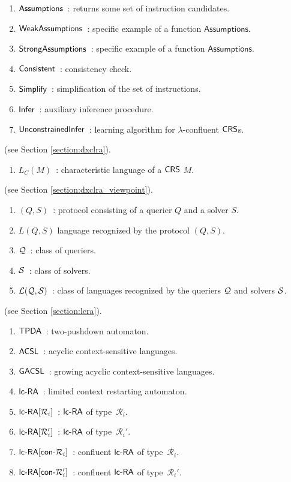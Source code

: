 \begin{enumerate}[]
\item $\textup{\sf Assumptions}$\ : returns some set of instruction candidates.
\item $\textup{\sf WeakAssumptions}$\ : specific example of a function $\mathsf{Assumptions}$.
\item $\textup{\sf StrongAssumptions}$\ : specific example of a function $\mathsf{Assumptions}$.
\item $\textup{\sf Consistent}$\ : consistency check.
\item $\textup{\sf Simplify}$\ : simplification of the set of instructions.
\item $\textup{\sf Infer}$\ : auxiliary inference procedure.
\item $\textup{\sf UnconstrainedInfer}$\ : learning algorithm for $\lambda$-confluent $\textup{\sf CRS\/}$s.
\end{enumerate}


 (see Section \ref{section:dxclra}).

\begin{enumerate}[]
\item $L_C(M)$\ : characteristic language of a $\textup{\sf CRS\/}$ $M$.
\end{enumerate}

 (see Section \ref{section:dxclra_viewpoint}).

\begin{enumerate}[]
\item $(Q, S)$\ : protocol consisting of a querier $Q$ and a solver $S$.
\item $L(Q, S)$ language recognized by the protocol $(Q, S)$.
\item $\mathcal{Q}$\ : class of queriers.
\item $\mathcal{S}$\ : class of solvers.
\item ${\cal L}(\mathcal{Q}, \mathcal{S})$\ : class of languages recognized by the queriers $\mathcal{Q}$ and solvers $\mathcal{S}$.
\end{enumerate}

 (see Section \ref{section:lcra}).

\begin{enumerate}[]
\item $\textup{\sf TPDA}$\ : two-pushdown automaton.
\item $\textup{\sf ACSL}$\ : acyclic context-sensitive languages.
\item $\textup{\sf GACSL}$\ : growing acyclic context-sensitive languages.
\item $\lcRA$\ : limited context restarting automaton.
\item $\lcRA[i]$\ : $\lcRA$ of type~$\mathcal{R}_i$.
\item $\lcRAp[i]$\ : $\lcRA$ of type~$\mathcal{R}_i'$.
\item $\textup{\sf lc-RA$[\textup{\sf con-}\mathcal{R}_i]$}$\ : confluent $\lcRA$ of type~$\mathcal{R}_i$.
\item $\textup{\sf lc-RA$[\textup{\sf con-}\mathcal{R}_i']$}$\ : confluent $\lcRA$ of type~$\mathcal{R}_i'$.
\end{enumerate}
